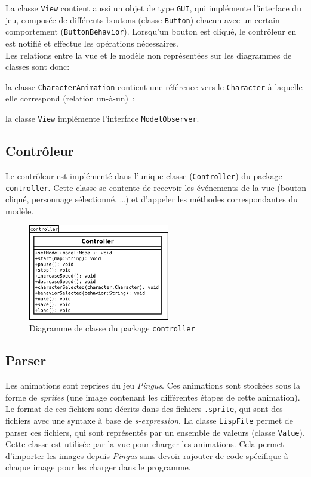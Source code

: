 \documentclass[a4paper,12pt]{article}
\begin{document}
La classe \texttt{View} contient aussi un objet de type \texttt{GUI},
qui implémente l'interface du jeu, composée de différents boutons
(classe \texttt{Button}) chacun avec un certain comportement
(\texttt{ButtonBehavior}). Lorsqu'un bouton est cliqué, le contrôleur
en est notifié et effectue les opérations nécessaires.\\

Les relations entre la vue et le modèle non représentées sur les
diagrammes de classes sont donc:
\begin{list}{-}{}
  \item la classe \texttt{CharacterAnimation} contient une référence
    vers le \texttt{Character} à laquelle elle correspond (relation
    un-à-un)~;
  \item la classe \texttt{View} implémente l'interface
    \texttt{ModelObserver}.
\end{list}

\subsection{Contrôleur}
Le contrôleur est implémenté dans l'unique classe
(\texttt{Controller}) du package \texttt{controller}. Cette
classe se contente de recevoir les événements de la vue
(bouton cliqué, personnage sélectionné, \dots) et d'appeler
les méthodes correspondantes du modèle.

\begin{figure}[ht!]
  \centerline{
  \includegraphics[width=0.55\textwidth]{controller.png}}
  \caption{Diagramme de classe du package \texttt{controller}}
\end{figure}

\subsection{Parser}
Les animations sont reprises du jeu \emph{Pingus}. Ces animations sont
stockées sous la forme de \emph{sprites} (une image contenant les
différentes étapes de cette animation). Le format de ces fichiers sont
décrits dans des fichiers \texttt{.sprite}, qui sont des fichiers avec
une syntaxe à base de \emph{s-expression}. La classe \texttt{LispFile}
permet de parser ces fichiers, qui sont représentés par un ensemble de
valeurs (classe \texttt{Value}). Cette classe est utilisée par la vue
pour charger les animations. Cela permet d'importer les images depuis
\emph{Pingus} sans devoir rajouter de code spécifique à chaque image
pour les charger dans le programme.
\end{document}
